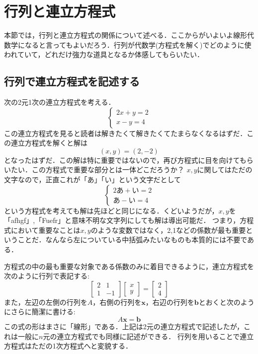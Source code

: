 \documentclass[a4paper,12pt,autodetect-engine,dvipdfmx]{jsarticle}
\theoremstyle{definition}
\begin{document}
\section{行列と連立方程式}
本節では，行列と連立方程式の関係について述べる．ここからがいよいよ線形代数学になると言ってもよいだろう．行列が代数学(方程式を解く)でどのように使われていて，どれだけ強力な道具となるか体感してもらいたい．
\subsection{行列で連立方程式を記述する}
次の2元1次の連立方程式を考える．
\begin{equation*}
    \begin{cases}
        2x + y = 2\\
        x - y = 4
    \end{cases}
\end{equation*}
この連立方程式を見ると読者は解きたくて解きたくてたまらなくなるはずだ．この連立方程式を解くと解は
\begin{equation*}
    (x,y) = (2,-2)
\end{equation*}
となったはずだ．この解は特に重要ではないので，再び方程式に目を向けてもらいたい．この方程式で重要な部分とは一体どこだろうか？
$x,y$に関してはただの文字なので，正直これが「あ」「い」という文字だとして
\begin{equation*}
    \begin{cases}
        2あ + い = 2\\
        あ - い = 4
    \end{cases}
\end{equation*}
という方程式を考えても解は先ほどと同じになる．くどいようだが，$x,y$を「afhgf」,「Fuefr」と意味不明な文字列にしても解は導出可能だ．
つまり，方程式において重要なことは$x,y$のような変数ではなく，2,1などの係数が最も重要ということだ．なんなら左についている中括弧みたいなものも本質的には不要である．

方程式の中の最も重要な対象である係数のみに着目できるように，連立方程式を次のように行列で表記する:
\begin{equation*}
    \begin{bmatrix}
        2 & 1\\
        1 & -1
    \end{bmatrix}
    \begin{bmatrix}
        x\\
        y
    \end{bmatrix}
    =
    \begin{bmatrix}
        2\\
        4
    \end{bmatrix}
\end{equation*}
また，左辺の左側の行列を$A$，右側の行列を$\bm{x}$，右辺の行列を$\bm{b}$とおくと次のようにさらに簡潔に書ける:
\begin{equation*}
    A\bm{x}=\bm{b}
\end{equation*}
この式の形はまさに「線形」である．上記は2元の連立方程式で記述したが，これは一般に$n$元の連立方程式でも同様に記述ができる．
行列を用いることで連立方程式はただの1次方程式へと変貌する．
\end{document}
